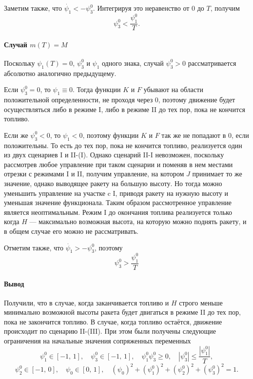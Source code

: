\documentclass[16pt]{article}
\begin{document}
Заметим также, что $\dot{\psi_1} < -\psi_3^0$. Интегрируя это неравенство от 0 до $T$, получим
$$\psi_3^0 < \dfrac{\psi_1^0}{T}.$$
 
\paragraph{Случай $m(T) = M$}
Поскольку $\psi_1(T) = 0$, $\psi_3^0$ и $\psi_1$ одного знака, случай $\psi_3^0 > 0$ рассматривается абсолютно
аналогично предыдущему.

Если $\psi_3^0 = 0$, то $\psi_1 \equiv 0$. Тогда функции $K$ и $F$ убывают на области положительной определенности, не
проходя через 0, поэтому движение будет осуществляться либо в режиме I, либо в режиме II до тех пор, пока не 
кончится топливо.

Если же $\psi_3^0 < 0$, то $\psi_1 < 0$, поэтому функции $K$ и $F$ так же не попадают в 0, если положительны. То 
есть до тех пор, пока не кончится топливо, реализуется один из двух сценариев I и II-(I). Однако сценарий II-I невозможен, поскольку рассмотрев любое
управление при таком сценарии и поменяв в нем местами отрезки с режимами I и II, получим управление, на котором $J$ принимает то же значение, однако выводящее ракету на большую высоту. Но тогда можно уменьшить управление на участке c I, приводя ракету на нужную высоту и уменьшая значение функционала. Таким образом рассмотренное управление является неоптимальным. Режим I до окончания топлива реализуется только когда $H$ --- максимально возможная высота, на которую
можно поднять ракету, и в общем случае его можно не рассматривать.

Отметим также, что $\dot{\psi_1} > -\psi_3^0$, поэтому 
$$\psi_3^0 > \dfrac{\psi_1^0}{T}$$

\paragraph{Вывод} Получили, что в случае, когда заканчивается топливо и $H$ строго меньше минимально возможной высоты
ракета будет двигаться в режиме II до тех пор, пока не закончится топливо. В случае, когда топливо остаётся, движение происходит по сценарию II-(III). При этом были получены следующие ограничения на
начальные значения сопряженных переменных
\begin{equation} \label{restr}
\psi_1^0 \in [-1,\, 1], \quad \psi_3^0 \in [-1,\,1],\quad \psi_1^0\psi_3^0 \geqslant 0, 
\quad |\psi_3^0| \leqslant \dfrac{|\psi_1^0|}{T},
\end{equation}
$$\psi_2^0 \in [-1,\, 0], \quad \psi_0 \in [0,\,1], \quad(\psi_0)^2 + (\psi_1^0)^2 + (\psi_2^0)^2 + (\psi_3^0)^2=1.$$
\end{document}
